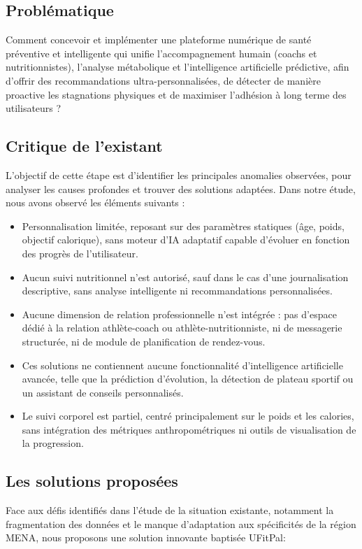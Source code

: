 ﻿\documentclass[a4paper,12pt]{report}
\begin{document}
\subsection{Problématique}
Comment concevoir et implémenter une plateforme numérique de santé préventive et intelligente qui unifie l'accompagnement humain (coachs et nutritionnistes), 
l'analyse métabolique et l'intelligence artificielle prédictive, afin d'offrir des recommandations ultra-personnalisées, de détecter de manière proactive les stagnations
 physiques et de maximiser l'adhésion à long terme des utilisateurs ? 

 
  
 
\subsection{Critique de l'existant}

L'objectif de cette étape est d'identifier les principales anomalies observées, 
pour analyser les causes profondes et trouver des solutions adaptées.
Dans notre étude, nous avons observé les éléments suivants :

\begin{itemize}[label=$\star$]
 \item  Personnalisation limitée, reposant sur des paramètres statiques (âge, poids, objectif calorique),
 sans moteur d'IA adaptatif capable d'évoluer en fonction des progrès de l'utilisateur.
 \item Aucun suivi nutritionnel n'est autorisé, sauf dans le cas d'une journalisation descriptive, 
 sans analyse intelligente ni recommandations personnalisées.
 \item Aucune dimension de relation professionnelle n'est intégrée : pas d'espace dédié à la relation athlète-coach ou athlète-nutritionniste, 
 ni de messagerie structurée, ni de module de planification de rendez-vous.
 \item Ces solutions ne contiennent aucune fonctionnalité d'intelligence artificielle avancée, telle que la prédiction d'évolution,
 la détection de plateau sportif ou un assistant de conseils personnalisés.
 \item Le suivi corporel est partiel, centré principalement sur le poids et les calories, sans intégration des métriques
 anthropométriques ni outils de visualisation de la progression.
 \end{itemize}
  


\subsection{Les solutions proposées}
Face aux défis identifiés dans l'étude de la situation existante,
 notamment la fragmentation des données et le manque d'adaptation aux spécificités de la région MENA,
  nous proposons une solution innovante baptisée UFitPal:
\end{document}
